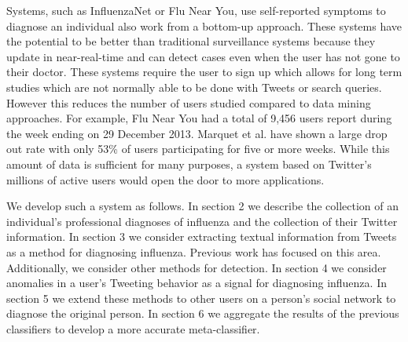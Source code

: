 \documentclass{acm_proc_article-sp}
\begin{document}
Systems, such as InfluenzaNet or Flu Near You, use self-reported symptoms to diagnose an individual also work from a bottom-up approach.\cite{Marquet:2005tb,VanNoort:2007uk} These systems have the potential to be better than traditional surveillance systems because they update in near-real-time and can detect cases even when the user has not gone to their doctor. These systems require the user to sign up which allows for long term studies which are not normally able to be done with Tweets or search queries. However this reduces the number of users studied compared to data mining approaches. For example, Flu Near You had a total of 9,456 users report during the week ending on 29 December 2013. Marquet et al. \cite{Marquet:2005tb} have shown a large drop out rate with only 53\% of users participating for five or more weeks. While this amount of data is sufficient for many purposes, a system based on Twitter's millions of active users would open the door to more applications.


%
%

We develop such a system as follows. In section 2 we describe the collection of an individual's professional diagnoses of influenza and the collection of their Twitter information. In section 3 we consider extracting textual information from Tweets as a method for diagnosing influenza. Previous work has focused on this area. Additionally, we consider other methods for detection. In section 4 we consider anomalies in a user's Tweeting behavior as a signal for diagnosing influenza. In section 5 we extend these methods to other users on a person's social network to diagnose the original person. In section 6 we aggregate the results of the previous classifiers to develop a more accurate meta-classifier.




\end{document}
